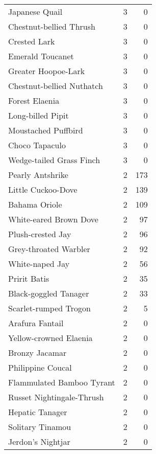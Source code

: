 \begin{longtable}{l r r}
Japanese Quail                  &3    &0     \\
Chestnut-bellied Thrush         &3    &0     \\
Crested Lark                    &3    &0     \\
Emerald Toucanet                &3    &0     \\
Greater Hoopoe-Lark             &3    &0     \\
Chestnut-bellied Nuthatch       &3    &0     \\
Forest Elaenia                  &3    &0     \\
Long-billed Pipit               &3    &0     \\
Moustached Puffbird             &3    &0     \\
Choco Tapaculo                  &3    &0     \\
Wedge-tailed Grass Finch        &3    &0     \\
Pearly Antshrike                &2    &173   \\
Little Cuckoo-Dove              &2    &139   \\
Bahama Oriole                   &2    &109   \\
White-eared Brown Dove          &2    &97    \\
Plush-crested Jay               &2    &96    \\
Grey-throated Warbler           &2    &92    \\
White-naped Jay                 &2    &56    \\
Pririt Batis                    &2    &35    \\
Black-goggled Tanager           &2    &33    \\
Scarlet-rumped Trogon           &2    &5     \\
Arafura Fantail                 &2    &0     \\
Yellow-crowned Elaenia          &2    &0     \\
Bronzy Jacamar                  &2    &0     \\
Philippine Coucal               &2    &0     \\
Flammulated Bamboo Tyrant       &2    &0     \\
Russet Nightingale-Thrush       &2    &0     \\
Hepatic Tanager                 &2    &0     \\
Solitary Tinamou                &2    &0     \\
Jerdon's Nightjar               &2    &0     \\

\end{longtable}
